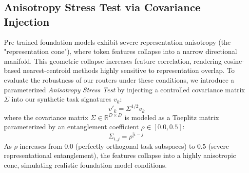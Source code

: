 \subsection{Anisotropy Stress Test via Covariance Injection}
Pre-trained foundation models exhibit severe representation anisotropy (the "representation cone"), where token features collapse into a narrow directional manifold. This geometric collapse increases feature correlation, rendering cosine-based nearest-centroid methods highly sensitive to representation overlap. To evaluate the robustness of our routers under these conditions, we introduce a parameterized \emph{Anisotropy Stress Test} by injecting a controlled covariance matrix $\Sigma$ into our synthetic task signatures $v_k$:
\begin{equation}
    v'_k = \Sigma^{1/2} v_k
\end{equation}
where the covariance matrix $\Sigma \in \mathbb{R}^{D \times D}$ is modeled as a Toeplitz matrix parameterized by an entanglement coefficient $\rho \in [0.0, 0.5]$:
\begin{equation}
    \Sigma_{i, j} = \rho^{|i - j|}
\end{equation}
As $\rho$ increases from $0.0$ (perfectly orthogonal task subspaces) to $0.5$ (severe representational entanglement), the features collapse into a highly anisotropic cone, simulating realistic foundation model conditions.

